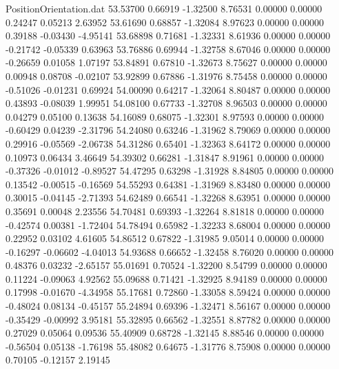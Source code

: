 \begin{filecontents}{PositionOrientation.dat}
  53.53700    0.66919   -1.32500     8.76531    0.00000    0.00000    0.24247    0.05213    2.63952
  53.61690    0.68857   -1.32084     8.97623    0.00000    0.00000    0.39188   -0.03430   -4.95141
  53.68898    0.71681   -1.32331     8.61936    0.00000    0.00000   -0.21742   -0.05339    0.63963
  53.76886    0.69944   -1.32758     8.67046    0.00000    0.00000   -0.26659    0.01058    1.07197
  53.84891    0.67810   -1.32673     8.75627    0.00000    0.00000    0.00948    0.08708   -0.02107
  53.92899    0.67886   -1.31976     8.75458    0.00000    0.00000   -0.51026   -0.01231    0.69924
  54.00090    0.64217   -1.32064     8.80487    0.00000    0.00000    0.43893   -0.08039    1.99951
  54.08100    0.67733   -1.32708     8.96503    0.00000    0.00000    0.04279    0.05100    0.13638
  54.16089    0.68075   -1.32301     8.97593    0.00000    0.00000   -0.60429    0.04239   -2.31796
  54.24080    0.63246   -1.31962     8.79069    0.00000    0.00000    0.29916   -0.05569   -2.06738
  54.31286    0.65401   -1.32363     8.64172    0.00000    0.00000    0.10973    0.06434    3.46649
  54.39302    0.66281   -1.31847     8.91961    0.00000    0.00000   -0.37326   -0.01012   -0.89527
  54.47295    0.63298   -1.31928     8.84805    0.00000    0.00000    0.13542   -0.00515   -0.16569
  54.55293    0.64381   -1.31969     8.83480    0.00000    0.00000    0.30015   -0.04145   -2.71393
  54.62489    0.66541   -1.32268     8.63951    0.00000    0.00000    0.35691    0.00048    2.23556
  54.70481    0.69393   -1.32264     8.81818    0.00000    0.00000   -0.42574    0.00381   -1.72404
  54.78494    0.65982   -1.32233     8.68004    0.00000    0.00000    0.22952    0.03102    4.61605
  54.86512    0.67822   -1.31985     9.05014    0.00000    0.00000   -0.16297   -0.06602   -4.04013
  54.93688    0.66652   -1.32458     8.76020    0.00000    0.00000    0.48376    0.03232   -2.65157
  55.01691    0.70524   -1.32200     8.54799    0.00000    0.00000    0.11224   -0.09063    4.92562
  55.09688    0.71421   -1.32925     8.94189    0.00000    0.00000    0.17998   -0.01670   -4.34958
  55.17681    0.72860   -1.33058     8.59424    0.00000    0.00000   -0.48024    0.08134   -0.45157
  55.24894    0.69396   -1.32471     8.56167    0.00000    0.00000   -0.35429   -0.00992    3.95181
  55.32895    0.66562   -1.32551     8.87782    0.00000    0.00000    0.27029    0.05064    0.09536
  55.40909    0.68728   -1.32145     8.88546    0.00000    0.00000   -0.56504    0.05138   -1.76198
  55.48082    0.64675   -1.31776     8.75908    0.00000    0.00000    0.70105   -0.12157    2.19145

\end{filecontents}

